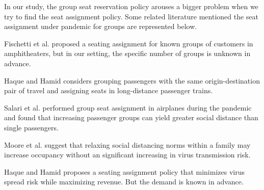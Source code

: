 
In our study, the group seat reservation policy arouses a bigger problem when we try to find the seat assignment policy. Some related literature mentioned the seat assignment under pandemic for groups are represented below.

Fischetti et al. \cite{fischetti2021safe} proposed a seating assignment for known groups of customers in amphitheaters, but in our setting, the specific number of groups is unknown in advance.  

Haque and Hamid \cite{haque2022optimization} considers grouping passengers with the same origin-destination pair of travel and assigning seats in long-distance passenger trains.

Salari et al. \cite{salari2022social} performed group seat assignment in airplanes during the pandemic and found that increasing passenger groups can yield greater social distance than single passengers. 

Moore et al. \cite{moore2021seat} suggest that relaxing social distancing norms within a family may increase occupancy without an significant increasing in virus transmission risk.





Haque and Hamid \cite{haque2023social} proposes a seating assignment policy that minimizes virus spread risk while maximizing revenue. But the demand is known in advance.


